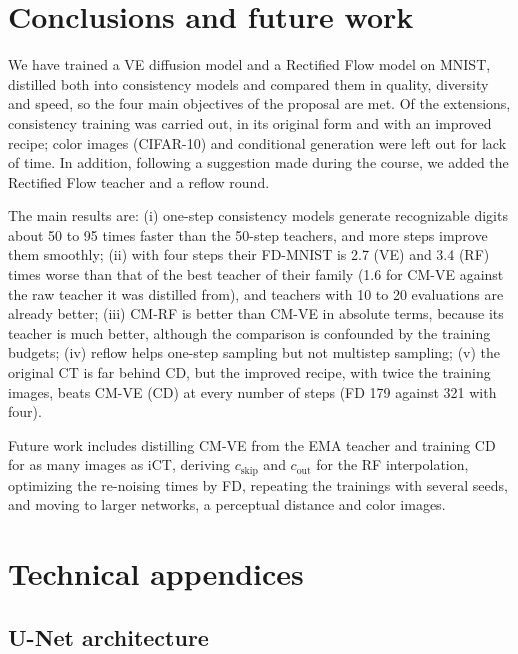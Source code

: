 \documentclass{article}
\begin{document}
\section{Conclusions and future work}
\label{sec:conclusions}

We have trained a VE diffusion model and a Rectified Flow model on MNIST,
distilled both into consistency models and compared them in quality,
diversity and speed, so the four main objectives of the proposal are met. Of
the extensions, consistency training was carried out, in its original form
and with an improved recipe; color images
(CIFAR-10) and conditional generation were left out for lack of time. In
addition, following a suggestion made during the course, we added the
Rectified Flow teacher and a reflow round.

The main results are: (i) one-step consistency models generate recognizable
digits about 50 to 95 times faster than the 50-step teachers, and more
steps improve them smoothly; (ii) with four steps their FD-MNIST is 2.7 (VE)
and 3.4 (RF) times worse than that of the best teacher of their family (1.6 for
CM-VE against the raw teacher it was distilled from), and teachers with 10 to 20
evaluations are already better; (iii) CM-RF is better than CM-VE in absolute
terms, because its teacher is much better, although the comparison is
confounded by the training budgets; (iv) reflow helps one-step sampling but
not multistep sampling; (v) the original CT is far behind CD, but the improved
recipe, with twice the training images, beats CM-VE (CD) at every number of
steps (FD 179 against 321 with four).

Future work includes distilling CM-VE from the EMA teacher and training CD
for as many images as iCT, deriving $c_\text{skip}$ and $c_\text{out}$ for the
RF interpolation, optimizing the re-noising times by FD, repeating the trainings
with several seeds, and moving to larger networks, a perceptual distance and
color images.

{\small


}

\appendix
\section{Technical appendices}
\label{sec:appendix}

\subsection{U-Net architecture}
\label{sec:app_unet}
\end{document}
